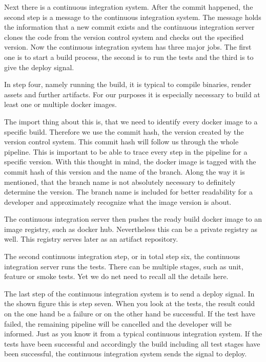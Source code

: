 Next there is a continuous integration system. After the commit happened, the second step is a message to the continuous integration system. The message holds the information that a new commit exists and the continuous integration server clones the code from the version control system and checks out the specified version. Now the continuous integration system has three major jobs. The first one is to start a build process, the second is to run the tests and the third is to give the deploy signal.

In step four, namely running the build, it is typical to compile binaries, render assets and further artifacts. For our purposes it is especially necessary to build at least one or multiple docker images.

The import thing about this is, that we need to identify every docker image to a specific build. Therefore we use the commit hash, the version created by the version control system. This commit hash will follow us through the whole pipeline. This is important to be able to trace every step in the pipeline for a specific version. With this thought in mind, the docker image is tagged with the commit hash of this version and the name of the branch. Along the way it is mentioned, that the branch name is not absolutely necessary to definitely determine the version. The branch name is included for better readability for a developer and approximately recognize what the image version is about.

The continuous integration server then pushes the ready build docker image to an image registry, such as docker hub. Nevertheless this can be a private registry as well. This registry serves later as an artifact repository.

The second continuous integration step, or in total step six, the continuous integration server runs the tests. There can be multiple stages, such as unit, feature or smoke tests. Yet we do net need to recall all the details here.

The last step of the continuous integration system is to send a deploy signal. In the shown figure this is step seven. When you look at the tests, the result could on the one hand be a failure or on the other hand be successful. If the test have failed, the remaining pipeline will be cancelled and the developer will be informed. Just as you know it from a typical continuous integration system. If the tests have been successful and accordingly the build including all test stages have been successful, the continuous integration system sends the signal to deploy.

